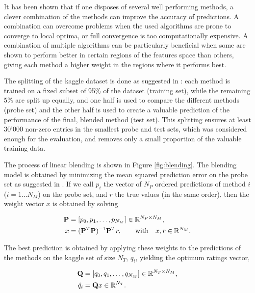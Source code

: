 It has been shown that if one disposes of several well performing methods,
a clever combination of the methods can improve the accuracy of predictions.   
A combination can overcome problems when the used algorithms are prone to
converge to local optima, or full convergence is too computationally expensive.
\cite{Dietterich}
A combination of multiple algorithms can be particularly beneficial when some
are shown to perform better in certain regions of the features space than
others, giving each method a higher weight in the regions where it performs
best.

The splitting of the kaggle dataset is done as suggested in
\cite{Andreas2009}: each method is trained on a fixed subset of 95\% of the
dataset (training set), while the remaining 5\% are split up equally, and one half is used to
compare the different methods (probe set) and the other half is used to create a
valuable prediction of the performance of the final, blended method (test set).  
This splitting ensures at least 30'000 non-zero entries in the smallest probe
and test sets,
which was considered enough for the evaluation, and removes only a small
proportion of the valuable training data.

The process of linear blending is shown in Figure \ref{fig:blending}. 
The blending model is obtained by minimizing the mean squared prediction error
on the probe set as suggested in \cite{Andreas2009}. 
If we call $p_i$ the vector of $N_P$ ordered predictions of
method $i$ ($i = 1\ldots N_M$) on the
probe set, and $r$ the true values (in the same order), then the weight vector
$x$ is obtained by solving 

\begin{align}
  \mathbf{P} &=[p_0, p_1, \ldots, p_{N_M}] \in\mathbb{R}^{N_P\times N_M}, \\
  x &= (\mathbf{P}^T\mathbf{P})^{-1}\mathbf{P}^Tr ,\hspace{2em} \text{with} \hspace{1em}
  x,r\in\mathbb{R}^{N_M}.
\end{align}

The best prediction is obtained by applying these weights to the predictions of
the methods on the kaggle set of size $N_T$, $q_i$, yielding the optimum ratings
vector,

\begin{align}
  \mathbf{Q} &=[q_0, q_1, \ldots, q_{N_M}]
  \in\mathbb{R}^{N_T\times N_M}, \\
  \hat{q}_i &= \mathbf{Q}x \in\mathbb{R}^{N_T}.
\end{align}


